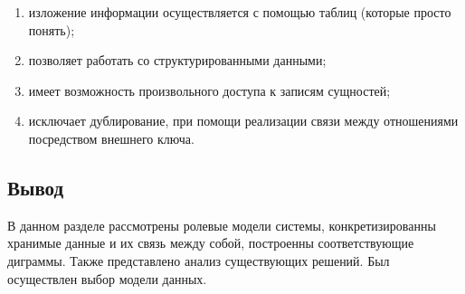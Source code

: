 \begin{enumerate}[label=\arabic*.]
	\item изложение информации осуществляется с помощью таблиц (которые просто понять);
	\item позволяет работать со структурированными данными;
	\item имеет возможность произвольного доступа к записям сущностей;
	\item исключает дублирование, при помощи реализации связи между отношениями посредством внешнего ключа.
\end{enumerate}

\subsection*{Вывод}

В данном разделе рассмотрены ролевые модели системы, конкретизированны хранимые данные и их
связь между собой, построенны соответствующие диграммы. Также представлено анализ существующих решений.
Был осуществлен выбор модели данных.